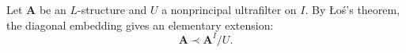 Let $\mathbf{A}$ be an $L$-structure and $U$ a nonprincipal ultrafilter on $I$. By {\L}o{\'s}'s theorem, the diagonal embedding gives an elementary extension:
$$\mathbf{A} \prec \mathbf{A}^I / U.$$
